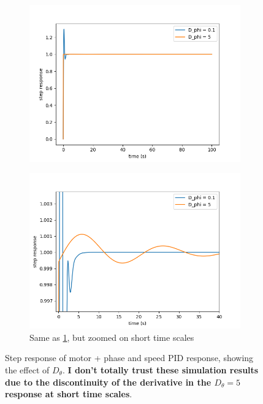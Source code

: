 \documentclass[11pt]{article} %
\begin{document}
\begin{figure}
\centering
	\begin{subfigure}[t]{0.5\textwidth}
		\includegraphics[width=\linewidth]{StepResponse.png}
		\caption{}
		\label{fig:StepResponse}
	\end{subfigure}%
	\begin{subfigure}[t]{0.5\textwidth}
		\includegraphics[width=\linewidth]{StepResponse_zoom.png}
		\caption{Same as \ref{fig:StepResponse}, but zoomed on short time scales}
		\label{fig:StepResponse_zoom}
	\end{subfigure}
	\caption{Step response of motor + phase and speed PID response, showing the effect of $D_\theta$. \textbf{I don't totally trust these simulation results due to the discontinuity of the derivative in the $D_\theta = 5$ response at short time scales}.}
\end{figure}
\end{document}
